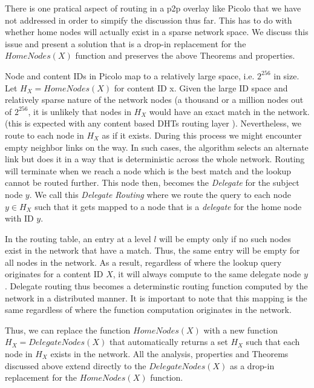 There is one pratical aspect of routing in a p2p overlay like Picolo that we have not addressed in order to
simpify the discussion thus far.  This has to do with whether home nodes will actually exist in a sparse network space.
We discuss this issue and present a solution that is a drop-in replacement for the \(HomeNodes(X)\) function and
preserves the above Theorems and properties.

Node and content IDs in Picolo map to a relatively large space, i.e. \(2^{256}\) in size. Let \( H_X =
HomeNodes(X)\) for content ID x. Given the large ID space and relatively sparse nature of the network nodes (a
thousand or a million nodes out of \(2^{256}\), it is unlikely that nodes in \(H_X\) would have an exact match in the
network. (this is expected with any content based DHTs routing layer \cite{Stoica_2001, Rowstron_2001}).
Nevertheless, we route to each node in \(H_X\) as if it exists. During this process we might encounter empty neighbor
links on the way. In such cases, the algorithm selects an alternate link but does it in a way that is deterministic
across the whole network. Routing will terminate when we reach a node which is the best match and the lookup cannot be
routed further. This node then, becomes the {\em Delegate} for the subject node \(y\). We call this {\em Delegate
Routing} where we route the query to each node \(y \in H_X \) such that it gets mapped to a node that is a {\em
delegate} for the home node with ID \(y\).

In the routing table, an entry at a level \(l\) will be empty only if no such nodes exist in the network that have a
match. Thus, the same entry will be empty for all nodes in the network. As a result, regardless of where the lookup
query originates for a content ID \(X\), it will always compute to the same delegate node \(y\). Delegate routing thus
becomes a determinstic routing function computed by the network in a distributed manner. It is important to note that
this mapping is the same regardless of where the function computation originates in the network.

Thus, we can replace the function \(HomeNodes(X)\) with a new function \(H_X = DelegateNodes(X)\) that automatically returns a
set \(H_X\) such that each node in \(H_X\) exists in the network. All the analysis, properties and Theorems discussed
above extend directly to the \(DelegateNodes(X)\) as a drop-in replacement for the \(HomeNodes(X)\) function.


